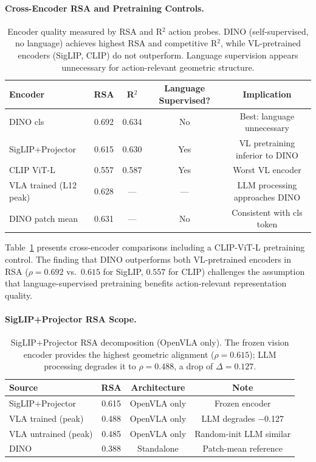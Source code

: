 \documentclass[letterpaper]{article}
\begin{document}
\paragraph{Cross-Encoder RSA and Pretraining Controls.}

\begin{table}[h]
\centering
\caption{Encoder quality measured by RSA and R$^2$ action probes. DINO (self-supervised, no language) achieves highest RSA and competitive R$^2$, while VL-pretrained encoders (SigLIP, CLIP) do not outperform. Language supervision appears unnecessary for action-relevant geometric structure.}
\label{tab:encoder_rsa}
\begin{tabular}{lcccc}
\toprule
Encoder & RSA & R$^2$ & Language Supervised? & Implication \\
\midrule
DINO cls & 0.692 & 0.634 & No & Best: language unnecessary \\
SigLIP+Projector & 0.615 & 0.630 & Yes & VL pretraining inferior to DINO \\
CLIP ViT-L & 0.557 & 0.587 & Yes & Worst VL encoder \\
VLA trained (L12 peak) & 0.628 & --- & --- & LLM processing approaches DINO \\
DINO patch mean & 0.631 & --- & No & Consistent with cls token \\
\bottomrule
\end{tabular}
\end{table}

Table~\ref{tab:encoder_rsa} presents cross-encoder comparisons including a CLIP-ViT-L pretraining control. The finding that DINO outperforms both VL-pretrained encoders in RSA ($\rho = 0.692$ vs.\ $0.615$ for SigLIP, $0.557$ for CLIP) challenges the assumption that language-supervised pretraining benefits action-relevant representation quality.

\paragraph{SigLIP+Projector RSA Scope.}

\begin{table}[h]
\centering
\caption{SigLIP+Projector RSA decomposition (OpenVLA only). The frozen vision encoder provides the highest geometric alignment ($\rho = 0.615$); LLM processing degrades it to $\rho = 0.488$, a drop of $\Delta = 0.127$.}
\label{tab:siglip_scope}
\begin{tabular}{lccc}
\toprule
Source & RSA & Architecture & Note \\
\midrule
SigLIP+Projector & 0.615 & OpenVLA only & Frozen encoder \\
VLA trained (peak) & 0.488 & OpenVLA only & LLM degrades $-$0.127 \\
VLA untrained (peak) & 0.485 & OpenVLA only & Random-init LLM similar \\
DINO & 0.388 & Standalone & Patch-mean reference \\
\bottomrule
\end{tabular}
\end{table}
\end{document}
